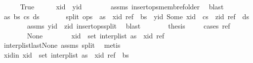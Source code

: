 \begin{isabellebody}
\ \ \ \ \isamarkupfalse%
\ True\isanewline
\ \ \ \ \isamarkupfalse%
\ {\isachardoublequoteopen}xid\ {\isacharless}\ yid{\isachardoublequoteclose}\isanewline
\ \ \ \ \ \ \isamarkupfalse%
\ assms\ insert{\isacharunderscore}ops{\isacharunderscore}memb{\isacharunderscore}ref{\isacharunderscore}older\ \isamarkupfalse%
\ blast\isanewline
\ \ \ \ \isamarkupfalse%
\ \isamarkupfalse%
\ as\ bs\ cs\ ds\isanewline
\ \ \ \ \ \ \ split{\isacharcolon}\ {\isachardoublequoteopen}ops\ {\isacharequal}\ as\ {\isacharat}\ {\isacharbrackleft}{\isacharparenleft}xid{\isacharcomma}\ ref{\isacharparenright}{\isacharbrackright}\ {\isacharat}\ bs\ {\isacharat}\ {\isacharbrackleft}{\isacharparenleft}yid{\isacharcomma}\ Some\ xid{\isacharparenright}{\isacharbrackright}\ {\isacharat}\ cs\ {\isacharat}\ {\isacharbrackleft}{\isacharparenleft}zid{\isacharcomma}\ ref{\isacharparenright}{\isacharbrackright}\ {\isacharat}\ ds{\isachardoublequoteclose}\isanewline
\ \ \ \ \ \ \isamarkupfalse%
\ assms\ {\isacartoucheopen}yid\ {\isacharless}\ zid{\isacartoucheclose}\ insert{\isacharunderscore}ops{\isacharunderscore}split{\isacharunderscore}{}\ \isamarkupfalse%
\ blast\isanewline
\ \ \ \ \isamarkupfalse%
\ \isamarkupfalse%
\ {\isacharquery}thesis\isanewline
\ \ \ \ \isamarkupfalse%
{\isacharparenleft}cases\ ref{\isacharparenright}\isanewline
\ \ \ \ \ \ \isamarkupfalse%
\ None\isanewline
\ \ \ \ \ \ \isamarkupfalse%
\ {\isachardoublequoteopen}xid\ {\isasymin}\ set\ {\isacharparenleft}interp{\isacharunderscore}list\ {\isacharparenleft}as\ {\isacharat}\ {\isacharbrackleft}{\isacharparenleft}xid{\isacharcomma}\ ref{\isacharparenright}{\isacharbrackright}{\isacharparenright}{\isacharparenright}{\isachardoublequoteclose}\isanewline
\ \ \ \ \ \ \ \ \isamarkupfalse%
\ interp{\isacharunderscore}list{\isacharunderscore}last{\isacharunderscore}None\ assms{\isacharparenleft}{}{\isacharparenright}\ split\ \isamarkupfalse%
\ metis\isanewline
\ \ \ \ \ \ \isamarkupfalse%
\ xid{\isacharunderscore}in{\isacharcolon}\ {\isachardoublequoteopen}xid\ {\isasymin}\ set\ {\isacharparenleft}interp{\isacharunderscore}list\ {\isacharparenleft}as\ {\isacharat}\ {\isacharbrackleft}{\isacharparenleft}xid{\isacharcomma}\ ref{\isacharparenright}{\isacharbrackright}\ {\isacharat}\ bs{\isacharparenright}{\isacharparenright}{\isachardoublequoteclose}\isanewline

\end{isabellebody}
